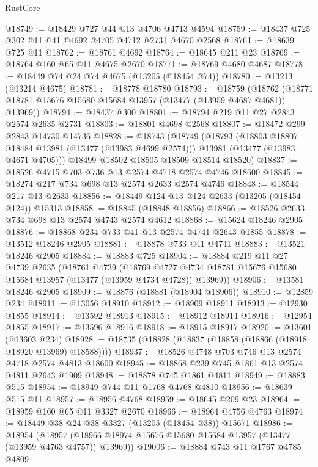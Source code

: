 \begin{lexlean}{RustCore}
\begin{coremodule}
@18749 := @18429 @727 @44 @13 @4706 @4713 @4594
@18759 := @18437 @725 @302 @11 @41 @4692 @4705 @4712 @2731 @4670 @2568
@18761 := @18639 @725 @11
@18762 := @18761 @4692
@18764 := @18645 @211 @23
@18769 := @18764 @160 @65 @11 @4675 @2670
@18771 := @18769 @4680 @4687
@18778 := @18449 @74 @24 @74 @4675 (@13205 (@18454 @74))
@18780 := @13213 (@13214 @4675)
@18781 := @18778 @18780
@18793 := @18759
    (@18762 (@18771 @18781 @15676 @15680 @15684 @13957 (@13477 (@13959 @4687 @4681)) @13969))
@18794 := @18437 @300
@18801 := @18794 @219 @11 @27 @2843 @2574 @2635 @2731
@18803 := @18801 @4698 @2568
@18807 := @18472 @299 @2843 @14730 @14736
@18828 := @18743
    (@18749
      (@18793
        (@18803 @18807 @18484 @13981 (@13477 (@13983 @4699 @2574)))
        @13981
        (@13477 (@13983 @4671 @4705)))
      @18499
      @18502
      @18505
      @18509
      @18514
      @18520)
@18837 := @18526 @4715 @703 @736 @13 @2574 @4718 @2574 @4746 @18600
@18845 := @18274 @217 @734 @698 @13 @2574 @2633 @2574 @4746
@18848 := @18544 @217 @13 @2633
@18856 := @18449 @124 @13 @124 @2633 (@13205 (@18454 @124)) @15313
@18858 := @18845 (@18848 @18856)
@18866 := @18526 @2633 @734 @698 @13 @2574 @4743 @2574 @4612
@18868 := @15624 @18246 @2905
@18876 := @18868 @234 @733 @41 @13 @2574 @4741 @2643 @1855
@18878 := @13512 @18246 @2905
@18881 := @18878 @733 @41 @4741
@18883 := @13521 @18246 @2905
@18884 := @18883 @725
@18904 := @18884
    @219
    @11
    @27
    @4739
    @2635
    (@18761
      @4739
      (@18769 @4727 @4734 @18781 @15676 @15680 @15684 @13957 (@13477 (@13959 @4734 @4728)) @13969))
@18906 := @13581 @18246 @2905
@18909 := @18876 (@18881 (@18904 @18906))
@18910 := @12859 @234
@18911 := @13056 @18910
@18912 := @18909 @18911
@18913 := @12930 @1855
@18914 := @13592 @18913
@18915 := @18912 @18914
@18916 := @12954 @1855
@18917 := @13596 @18916
@18918 := @18915 @18917
@18920 := @13601 (@13603 @234)
@18928 := @18735 (@18828 (@18837 (@18858 (@18866 (@18918 @18920 @13969) @18588))))
@18937 := @18526 @4748 @703 @746 @13 @2574 @4718 @2574 @4813 @18600
@18945 := @18868 @239 @745 @1861 @13 @2574 @4811 @2643 @1909
@18948 := @18878 @745 @1861 @4811
@18949 := @18883 @515
@18954 := @18949 @744 @11 @1768 @4768 @4810
@18956 := @18639 @515 @11
@18957 := @18956 @4768
@18959 := @18645 @209 @23
@18964 := @18959 @160 @65 @11 @3327 @2670
@18966 := @18964 @4756 @4763
@18974 := @18449 @38 @24 @38 @3327 (@13205 (@18454 @38)) @15671
@18986 := @18954
    (@18957 (@18966 @18974 @15676 @15680 @15684 @13957 (@13477 (@13959 @4763 @4757)) @13969))
@19006 := @18884
    @743
    @11
    @1767
    @4785
    @4809

\end{coremodule}
\end{lexlean}
